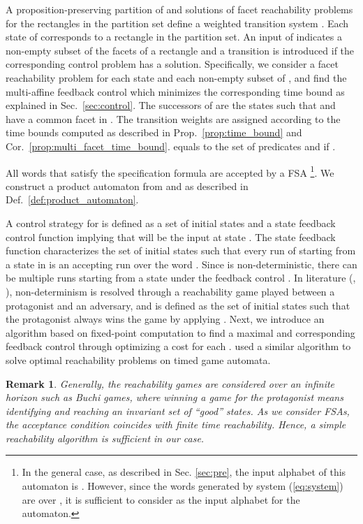 \documentclass{ifacconf}
\newtheorem{remark}{Remark}
\begin{document}
A proposition-preserving partition of  and solutions of facet reachability problems for the rectangles in the partition set define a weighted transition system .
Each state  of  corresponds to a rectangle  in the partition set. 
An input  of  indicates a non-empty subset of the facets of a rectangle and a transition  is introduced if the corresponding control problem has a solution. 
Specifically, we consider a facet reachability problem for each state  and each non-empty subset of , and find the multi-affine feedback control which minimizes the corresponding time bound as explained in Sec.~\ref{sec:control}.
The successors of   are the states  such that  and  have a common facet in . 
The transition weights are assigned according to the time bounds computed as described in Prop.~\ref{prop:time_bound} and Cor.~\ref{prop:multi_facet_time_bound}.  equals to the set of predicates  and  if .

All words that satisfy the specification formula  are accepted by a FSA  \footnote{In the general case, as described in Sec. \ref{sec:pre}, the input alphabet of this automaton is . However, since the words generated by system (\ref{eq:system})
are over , it is sufficient to consider  as the input alphabet for the automaton.}. We construct a product automaton   from  and  as described in Def.~\ref{def:product_automaton}.

\newcommand{\ControlSet}{{SC}}
\newcommand{\StateCost}{J}


A control strategy  for  is defined as a set of initial states  and a state feedback control function  implying that  will be the input at state . The state feedback function  characterizes the set of initial states  such that every run  of  starting from a state  in  is an accepting run over the word .
Since  is non-deterministic, there can be multiple runs starting from a state  under the feedback control . In literature (\cite{Kloetzer:2008NonDet}, \cite{Wolfgang2002}), non-determinism is resolved through a reachability game played between a protagonist and an adversary, and   is defined as the set of initial states such that the protagonist always wins the game by applying . 
Next, we introduce an algorithm based on fixed-point computation to find a maximal  and corresponding feedback control  through optimizing a cost for each . \cite{Asarin:1999} used a similar algorithm to solve optimal reachability problems on timed game automata. 

\begin{remark}
Generally, the reachability games are considered over an infinite horizon such as Buchi games, where winning a game for the protagonist means identifying and reaching an invariant set of ``good'' states.  
As we consider FSAs, the acceptance condition coincides with finite time reachability. 
Hence, a simple reachability algorithm is sufficient in our case.
\end{remark}
\end{document}
